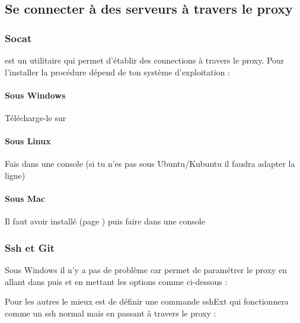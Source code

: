 \subsection{Se connecter à des serveurs à travers le proxy}

\subsubsection{Socat}

 est un utilitaire qui permet d'établir des connections à travers le proxy. Pour l'installer la procédure dépend de ton système d'exploitation :

\paragraph{Sous Windows} Télécharge-le sur 
\paragraph{Sous Linux} Fais  dans une console (si tu n'es pas sous Ubuntu/Kubuntu il faudra adapter la ligne)
\paragraph{Sous Mac} Il faut avoir installé  (page \pageref{mac-fink}) puis faire dans une console

\subsubsection{Ssh et Git}

Sous Windows il n'y a pas de problème car  permet de paramétrer le proxy en allant dans  puis  et en mettant les options comme ci-dessous :


Pour les autres le mieux est de définir une commande sshExt qui fonctionnera comme un ssh normal mais en passant à travers le proxy :

